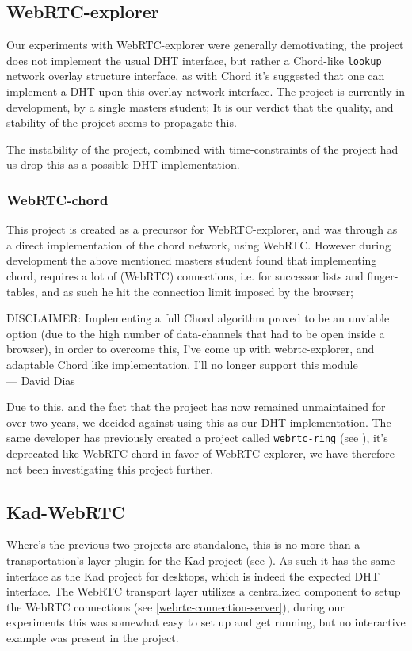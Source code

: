 \subsection{WebRTC-explorer}
Our experiments with WebRTC-explorer were generally demotivating, the project
does not implement the usual \acs{DHT} interface, but rather a Chord-like
\verb|lookup| network overlay structure interface, as with Chord it's suggested
that one can implement a \acs{DHT} upon this overlay network interface.
\newline
The project is currently in development, by a single masters student; It is our
verdict that the quality, and stability of the project seems to propagate this.

The instability of the project, combined with time-constraints of the project
had us drop this as a possible \acs{DHT} implementation.

\subsubsection{WebRTC-chord}
This project is created as a precursor for WebRTC-explorer, and was through as
a direct implementation of the chord network, using WebRTC. However during 
development the above mentioned masters student found that implementing chord,
requires a lot of (WebRTC) connections, i.e. for successor lists and
finger-tables, and as such he hit the connection limit imposed by the browser;

\begin{displayquote}
    DISCLAIMER: Implementing a full Chord algorithm proved to be an unviable option
    (due to the high number of data-channels that had to be open inside a browser),
    in order to overcome this, I've come up with webrtc-explorer, and adaptable
    Chord like implementation. I'll no longer support this module \\ \medskip
    --- David Dias
\end{displayquote}
Due to this, and the fact that the project has now remained unmaintained for
over two years, we decided against using this as our \acs{DHT} implementation.
\newline\newline
The same developer has previously created a project called \verb|webrtc-ring|
(see \citep{diasdavid:webrtc-ring}), it's deprecated like WebRTC-chord in favor
of WebRTC-explorer, we have therefore not been investigating this project
further.

\subsection{Kad-WebRTC}
Where's the previous two projects are standalone, this is no more than a 
transportation's layer plugin for the Kad project (see \citep{kadtools:kad}).
As such it has the same interface as the Kad project for desktops, which is
indeed the  expected \acs{DHT} interface. The WebRTC transport layer utilizes a
centralized component to setup the WebRTC connections (see
\ref{webrtc-connection-server}), during our experiments this was somewhat easy
to set up and get running, but no interactive example was present in the
project.

